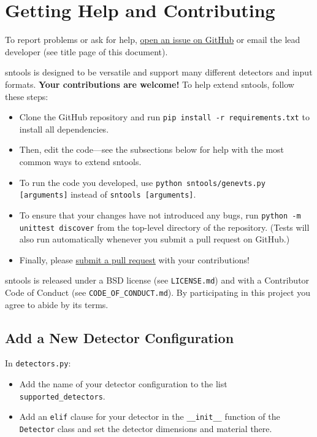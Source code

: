 \documentclass[11pt, oneside]{article}
\begin{document}
\section{Getting Help and Contributing}

To report problems or ask for help, \href{https://github.com/JostMigenda/sntools/issues}{open an issue on GitHub} or email the lead developer (see title page of this document).

sntools is designed to be versatile and support many different detectors and input formats.
\textbf{Your contributions are welcome!}
To help extend sntools, follow these steps:

\begin{itemize}
	\item Clone the GitHub repository and run \texttt{pip install -r requirements.txt} to install all dependencies.
	\item Then, edit the code---see the subsections below for help with the most common ways to extend sntools.
	\item To run the code you developed, use \texttt{python sntools/genevts.py [arguments]} instead of \texttt{sntools [arguments]}.
	\item To ensure that your changes have not introduced any bugs, run \texttt{python -m unittest discover} from the top-level directory of the repository. (Tests will also run automatically whenever you submit a pull request on GitHub.)
	\item Finally, please \href{https://docs.github.com/en/github/collaborating-with-issues-and-pull-requests/about-pull-requests}{submit a pull request} with your contributions!
\end{itemize}

sntools is released under a BSD license (see \texttt{LICENSE.md}) and with a Contributor Code of Conduct (see \texttt{CODE\_OF\_CONDUCT.md}).
By participating in this project you agree to abide by its terms.


\subsection{Add a New Detector Configuration}\label{sec:new-detector-config}

In \texttt{detectors.py}:
\begin{itemize}
\item Add the name of your detector configuration to the list \texttt{supported\_detectors}.
\item Add an \texttt{elif} clause for your detector in the \texttt{\_\_init\_\_} function of the \texttt{Detector} class and set the detector dimensions and material there.
\end{itemize}
\end{document}
